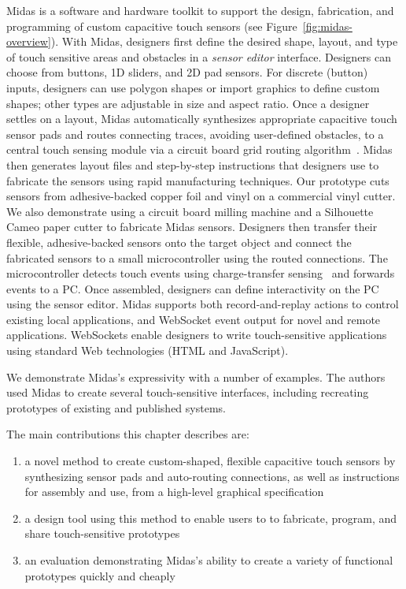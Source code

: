 Midas is a software and hardware toolkit to support the design, fabrication, and programming of custom capacitive touch sensors (see Figure~\ref{fig:midas-overview}). With Midas, designers first define the desired shape, layout, and type of touch sensitive areas and obstacles in a {\em sensor editor} interface. Designers can choose from buttons, 1D sliders, and 2D pad sensors. For discrete (button) inputs, designers can use polygon shapes or import graphics to define custom shapes; other types are adjustable in size and aspect ratio. Once a designer settles on a layout, Midas automatically synthesizes appropriate capacitive touch sensor pads and routes connecting traces, avoiding user-defined obstacles, to a central touch sensing module via a circuit board grid routing algorithm~\cite{lee-maze}. Midas then generates layout files and step-by-step instructions that designers use to fabricate the sensors using rapid manufacturing techniques. Our prototype cuts sensors from adhesive-backed copper foil and vinyl on a commercial vinyl cutter.  We also demonstrate using a circuit board milling machine and a Silhouette Cameo paper cutter to fabricate Midas sensors. Designers then transfer their flexible, adhesive-backed sensors onto the target object and connect the fabricated sensors to a small microcontroller using the routed connections. The microcontroller detects touch events using charge-transfer sensing~\cite{philipp-chargetransfer} and forwards events to a PC. Once assembled, designers can define interactivity on the PC using the sensor editor. Midas supports both record-and-replay actions to control existing local applications, and WebSocket event output for novel and remote applications. WebSockets enable designers to write touch-sensitive applications using standard Web technologies (HTML and JavaScript).

We demonstrate Midas's expressivity with a number of examples. The authors used Midas to create several touch-sensitive interfaces, including recreating prototypes of existing and published systems.

The main contributions this chapter describes are: \begin{enumerate}
\item a novel method to create custom-shaped, flexible capacitive touch sensors by synthesizing sensor pads and auto-routing connections, as well as instructions for assembly and use, from a high-level graphical specification
\item a design tool using this method to enable users to to fabricate, program, and share touch-sensitive prototypes
\item an evaluation demonstrating Midas's ability to create a variety of functional prototypes quickly and cheaply
\end{enumerate}

